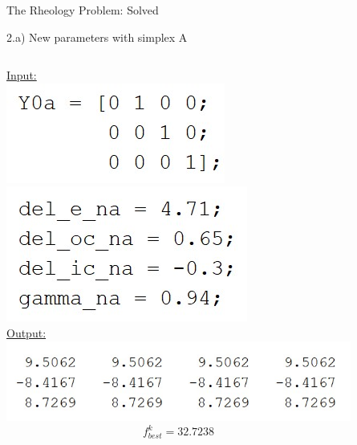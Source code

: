 \documentclass{beamer}
\begin{document}
\begin{frame}{The Rheology Problem: Solved}
\begin{block}{2.a) New parameters with simplex A}
\begin{columns}
\begin{column}{0.35\linewidth}
	\underline{Input:}\\
	\includegraphics[width=0.45\linewidth]{Y0a}\\
	\includegraphics[width=0.45\linewidth]{NewParamsA}\\
	\vspace{0.65cm}
	\underline{Output:}\\
	\includegraphics[width=0.95\linewidth]{1aSimplex}
	$$f^k_{best} = 32.7238$$
	\vspace{0.1cm}
\end{column}
\begin{column}{0.63\linewidth}
	\begin{figure}
	\end{figure}	
\end{column}
\end{columns}
\end{block}
\end{frame}
\end{document}
